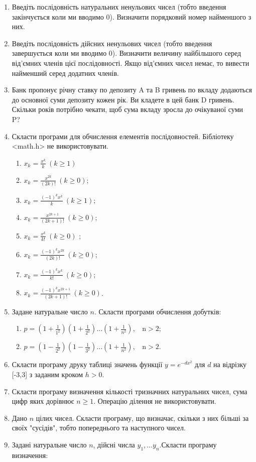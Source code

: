 \documentclass[a5paper,titlepage,openany,twoside,
]
{book_unv}%
\makeatletter
\newcommand{\xslalph}[1]{\expandafter\@xslalph\csname c@#1\endcsname}
\newcommand{\@xslalph}[1]{%
    \ifcase#1\or а\or б\or в\or г\or д\or e\or є\or ж\or з\or i%
    \or й\or к\or л\or м\or н\or о\or п\or р\or с\or т%
    \or у\or ф\or х\or ц\or ч\or ш\or ю\or я\or аа\or бб\or вв%
    \else\@ctrerr\fi%
}
\makeatother
\begin{document}
\begin{enumerate}
\item
  Введіть послідовність натуральних ненульових чисел (тобто введення
  закінчується коли ми вводимо 0). Визначити порядковий номер найменшого
  з них.
\item
  Введіть послідовність дійсних ненульових чисел (тобто введення
  завершується коли ми вводимо 0). Визначити величину найбільшого серед
  від'ємних членів цієї послідовності. Якщо від'ємних чисел немає, то
  вивести найменший серед додатних членів.
\item
  Банк пропонує річну ставку по депозиту A та B гривень по вкладу додаються
  до основної суми депозиту кожен рік. Ви кладете в цей банк D гривень.
  Скільки років потрібно чекати, щоб сума вкладу зросла до очікуваної
  суми P?
\item
  Скласти програми для обчислення елементів послідовностей. Бібліотеку
<math.h> не використовувати.
  \begin{multicols}{2}
\begin{enumerate}[label=\xslalph*)]
\item
\(x_{k} = \frac{x^{k}}{k}\ (k \geq 1)\) 
\item
\(x_{k} = \frac{x^{2k}}{(2k)!}\ (k \geq 0)\);
\item \(x_{k} = \frac{( - 1)^{k}x^{k}}{k}\ (k \geq 1)\); 
\item
\(x_{k} = \frac{x^{2k + 1}}{(2k + 1)!}\ (k \geq 0)\);
\item \(x_{k} = \frac{x^{k}}{k!}\ (k \geq 0)\) ;
\item \(x_{k} = \frac{(-1)^{k}x^{2k}}{(2k)!}\ (k \geq 0)\);
\item \(x_{k} = \frac{(-1)^{k}x^{k}}{k!}\ (k \geq 0)\); 
\item \(x_{k} = \frac{(-1)^{k}x^{2k + 1}}{(2k + 1)!}\ (k \geq  0)\).
 \end{enumerate}
  \end{multicols}
\item
  Задане натуральне число \(n\). Скласти програми обчислення добутків:
\begin{enumerate}[label=\xslalph*)]
\item
\(p = \left( 1 + \frac{1}{1^{2}} \right)\left( 1 + \frac{1}{2^{2}} \right)\ldots\left( 1 + \frac{1}{n^{2}} \right),\mathrm{\ \ \ \ n > 2};\)
\item
\(p = \left( 1 - \frac{1}{2^{2}} \right)\left( 1 - \frac{1}{3^{2}} \right)\ldots\left( 1 + \frac{1}{n^{2}} \right),\mathrm{\ \ \ \ n > 2.}\)
 \end{enumerate}
\item
  Скласти програму друку таблиці значень функції \(y = e^{-d x^{2}} \) для $d$ на
  відрізку {[}-3,3{]} з заданим кроком \(h>0\).
\item
  Скласти програму визначення кількості тризначних натуральних чисел,
  сума цифр яких дорівнює \(n \geq 1\). Операцію ділення не
  використовувати.
\item
  Дано \(n\) цілих чисел. Скласти програму, що визначає, скільки з
  них більші за своїх "сусідів", тобто попереднього та наступного чисел.
\item
  Задані натуральне число $n$, дійсні числа
  \(y_{1},\ldots y_{n}.\)Скласти програму визначення:


\end{enumerate}
\end{document}
